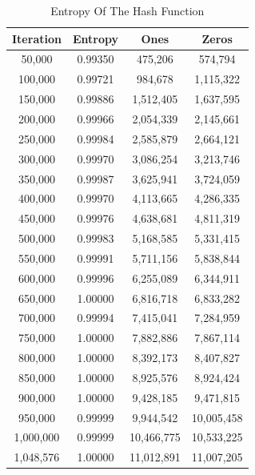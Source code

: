 \documentclass[preprint]{sigplanconf}
\begin{document}
\begin{table} [ht]
    \begin{center}
        \begin{tabular}{|c|c|c|c|}
            \hline
            \textbf{Iteration} & \textbf{Entropy} & \textbf{Ones} & \textbf{Zeros} \\
            \hline
            50,000             & 0.99350          & 475,206       & 574,794        \\
            100,000            & 0.99721          & 984,678       & 1,115,322      \\
            150,000            & 0.99886          & 1,512,405     & 1,637,595      \\
            200,000            & 0.99966          & 2,054,339     & 2,145,661      \\
            250,000            & 0.99984          & 2,585,879     & 2,664,121      \\
            300,000            & 0.99970          & 3,086,254     & 3,213,746      \\
            350,000            & 0.99987          & 3,625,941     & 3,724,059      \\
            400,000            & 0.99970          & 4,113,665     & 4,286,335      \\
            450,000            & 0.99976          & 4,638,681     & 4,811,319      \\
            500,000            & 0.99983          & 5,168,585     & 5,331,415      \\
            550,000            & 0.99991          & 5,711,156     & 5,838,844      \\
            600,000            & 0.99996          & 6,255,089     & 6,344,911      \\
            650,000            & 1.00000          & 6,816,718     & 6,833,282      \\
            700,000            & 0.99994          & 7,415,041     & 7,284,959      \\
            750,000            & 1.00000          & 7,882,886     & 7,867,114      \\
            800,000            & 1.00000          & 8,392,173     & 8,407,827      \\
            850,000            & 1.00000          & 8,925,576     & 8,924,424      \\
            900,000            & 1.00000          & 9,428,185     & 9,471,815      \\
            950,000            & 0.99999          & 9,944,542     & 10,005,458     \\
            1,000,000          & 0.99999          & 10,466,775    & 10,533,225     \\
            1,048,576          & 1.00000          & 11,012,891    & 11,007,205     \\
            \hline
        \end{tabular}
        \caption{Entropy Of The Hash Function}
        \label{tab-6}
    \end{center}
\end{table}
\end{document}

